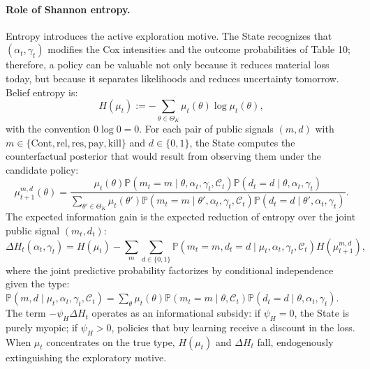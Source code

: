 \documentclass[12pt,a4paper]{article}
\theoremstyle{plain}
\theoremstyle{definition}
\theoremstyle{remark}
\newcommand{\ProbE}{\mathbb{P}}
\newcommand{\1}{\mathbf{1}}
\begin{document}
\paragraph{Role of Shannon entropy.}
Entropy introduces the active exploration motive. The State recognizes that $(\alpha_t,\gamma_t)$ modifies the Cox intensities and the outcome probabilities of Table 10; therefore, a policy can be valuable not only because it reduces material loss today, but because it separates likelihoods and reduces uncertainty tomorrow. Belief entropy is:
\begin{equation}
\label{eq:belief-entropy}
H(\mu_t)
:=
-\sum_{\theta\in\Theta_K}\mu_t(\theta)\log\mu_t(\theta),
\end{equation}
with the convention $0\log0=0$. For each pair of public signals $(m,d)$ with $m\in\{\mathrm{Cont},\mathrm{rel},\mathrm{res},\mathrm{pay},\mathrm{kill}\}$ and $d\in\{0,1\}$, the State computes the counterfactual posterior that would result from observing them under the candidate policy:
\begin{equation}
\label{eq:posterior-counterfactual-entropy}
\mu_{t+1}^{m,d}(\theta)
=
\frac{
\mu_t(\theta)\ProbE(m_t=m\mid\theta,\alpha_t,\gamma_t,\mathcal C_t)\ProbE(d_t=d\mid\theta,\alpha_t,\gamma_t)
}{
\sum_{\theta'\in\Theta_K}
\mu_t(\theta')\ProbE(m_t=m\mid\theta',\alpha_t,\gamma_t,\mathcal C_t)\ProbE(d_t=d\mid\theta',\alpha_t,\gamma_t)
}.
\end{equation}
The expected information gain is the expected reduction of entropy over the joint public signal $(m_t,d_t)$:
\begin{equation}
\label{eq:expected-information-gain}
\Delta H_t(\alpha_t,\gamma_t)
=
H(\mu_t)
-
\sum_{m}\sum_{d\in\{0,1\}}
\ProbE(m_t=m,d_t=d\mid\mu_t,\alpha_t,\gamma_t,\mathcal C_t)
H(\mu_{t+1}^{m,d}),
\end{equation}
where the joint predictive probability factorizes by conditional independence given the type: $\ProbE(m,d\mid\mu_t,\alpha_t,\gamma_t,\mathcal C_t)=\sum_{\theta}\mu_t(\theta)\ProbE(m_t=m\mid\theta,\mathcal C_t)\ProbE(d_t=d\mid\theta,\alpha_t,\gamma_t)$. The term $-\psi_H\Delta H_t$ operates as an informational subsidy: if $\psi_H=0$, the State is purely myopic; if $\psi_H>0$, policies that buy learning receive a discount in the loss. When $\mu_t$ concentrates on the true type, $H(\mu_t)$ and $\Delta H_t$ fall, endogenously extinguishing the exploratory motive.
\end{document}
